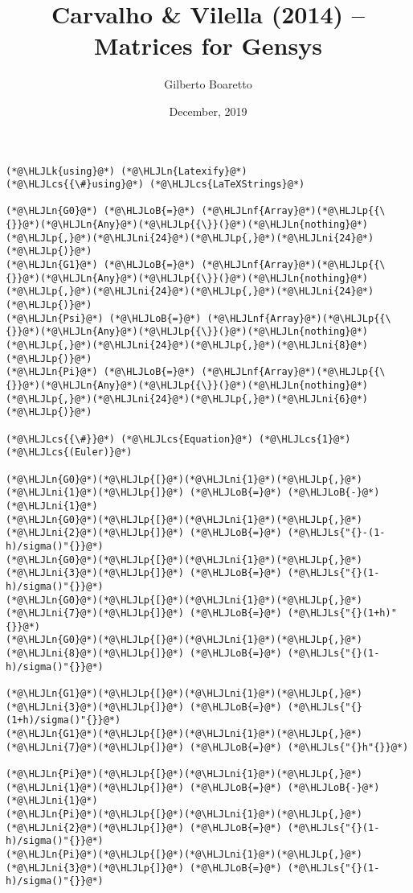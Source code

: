 \documentclass[12pt,a4paper]{article}
\title{ Carvalho & Vilella (2014) -- Matrices for Gensys }
\author{ Gilberto Boaretto }
\date{ December, 2019 }
\newcommand{\HLJLk}[1]{\textcolor[RGB]{148,91,176}{\textbf{#1}}}
\newcommand{\HLJLn}[1]{#1}
\newcommand{\HLJLnf}[1]{\textcolor[RGB]{66,102,213}{#1}}
\newcommand{\HLJLs}[1]{\textcolor[RGB]{201,61,57}{#1}}
\newcommand{\HLJLni}[1]{\textcolor[RGB]{59,151,46}{#1}}
\newcommand{\HLJLoB}[1]{\textcolor[RGB]{102,102,102}{\textbf{#1}}}
\newcommand{\HLJLp}[1]{#1}
\newcommand{\HLJLcs}[1]{\textcolor[RGB]{153,153,119}{\textit{#1}}}
\begin{document}
\maketitle


\begin{lstlisting}
(*@\HLJLk{using}@*) (*@\HLJLn{Latexify}@*)
(*@\HLJLcs{{\#}using}@*) (*@\HLJLcs{LaTeXStrings}@*)

(*@\HLJLn{G0}@*) (*@\HLJLoB{=}@*) (*@\HLJLnf{Array}@*)(*@\HLJLp{{\{}}@*)(*@\HLJLn{Any}@*)(*@\HLJLp{{\}}(}@*)(*@\HLJLn{nothing}@*)(*@\HLJLp{,}@*)(*@\HLJLni{24}@*)(*@\HLJLp{,}@*)(*@\HLJLni{24}@*)(*@\HLJLp{)}@*)
(*@\HLJLn{G1}@*) (*@\HLJLoB{=}@*) (*@\HLJLnf{Array}@*)(*@\HLJLp{{\{}}@*)(*@\HLJLn{Any}@*)(*@\HLJLp{{\}}(}@*)(*@\HLJLn{nothing}@*)(*@\HLJLp{,}@*)(*@\HLJLni{24}@*)(*@\HLJLp{,}@*)(*@\HLJLni{24}@*)(*@\HLJLp{)}@*)
(*@\HLJLn{Psi}@*) (*@\HLJLoB{=}@*) (*@\HLJLnf{Array}@*)(*@\HLJLp{{\{}}@*)(*@\HLJLn{Any}@*)(*@\HLJLp{{\}}(}@*)(*@\HLJLn{nothing}@*)(*@\HLJLp{,}@*)(*@\HLJLni{24}@*)(*@\HLJLp{,}@*)(*@\HLJLni{8}@*)(*@\HLJLp{)}@*)
(*@\HLJLn{Pi}@*) (*@\HLJLoB{=}@*) (*@\HLJLnf{Array}@*)(*@\HLJLp{{\{}}@*)(*@\HLJLn{Any}@*)(*@\HLJLp{{\}}(}@*)(*@\HLJLn{nothing}@*)(*@\HLJLp{,}@*)(*@\HLJLni{24}@*)(*@\HLJLp{,}@*)(*@\HLJLni{6}@*)(*@\HLJLp{)}@*)

(*@\HLJLcs{{\#}}@*) (*@\HLJLcs{Equation}@*) (*@\HLJLcs{1}@*) (*@\HLJLcs{(Euler)}@*)

(*@\HLJLn{G0}@*)(*@\HLJLp{[}@*)(*@\HLJLni{1}@*)(*@\HLJLp{,}@*)(*@\HLJLni{1}@*)(*@\HLJLp{]}@*) (*@\HLJLoB{=}@*) (*@\HLJLoB{-}@*)(*@\HLJLni{1}@*)
(*@\HLJLn{G0}@*)(*@\HLJLp{[}@*)(*@\HLJLni{1}@*)(*@\HLJLp{,}@*)(*@\HLJLni{2}@*)(*@\HLJLp{]}@*) (*@\HLJLoB{=}@*) (*@\HLJLs{"{}-(1-h)/sigma()"{}}@*)
(*@\HLJLn{G0}@*)(*@\HLJLp{[}@*)(*@\HLJLni{1}@*)(*@\HLJLp{,}@*)(*@\HLJLni{3}@*)(*@\HLJLp{]}@*) (*@\HLJLoB{=}@*) (*@\HLJLs{"{}(1-h)/sigma()"{}}@*)
(*@\HLJLn{G0}@*)(*@\HLJLp{[}@*)(*@\HLJLni{1}@*)(*@\HLJLp{,}@*)(*@\HLJLni{7}@*)(*@\HLJLp{]}@*) (*@\HLJLoB{=}@*) (*@\HLJLs{"{}(1+h)"{}}@*)
(*@\HLJLn{G0}@*)(*@\HLJLp{[}@*)(*@\HLJLni{1}@*)(*@\HLJLp{,}@*)(*@\HLJLni{8}@*)(*@\HLJLp{]}@*) (*@\HLJLoB{=}@*) (*@\HLJLs{"{}(1-h)/sigma()"{}}@*)

(*@\HLJLn{G1}@*)(*@\HLJLp{[}@*)(*@\HLJLni{1}@*)(*@\HLJLp{,}@*)(*@\HLJLni{3}@*)(*@\HLJLp{]}@*) (*@\HLJLoB{=}@*) (*@\HLJLs{"{}(1+h)/sigma()"{}}@*)
(*@\HLJLn{G1}@*)(*@\HLJLp{[}@*)(*@\HLJLni{1}@*)(*@\HLJLp{,}@*)(*@\HLJLni{7}@*)(*@\HLJLp{]}@*) (*@\HLJLoB{=}@*) (*@\HLJLs{"{}h"{}}@*)

(*@\HLJLn{Pi}@*)(*@\HLJLp{[}@*)(*@\HLJLni{1}@*)(*@\HLJLp{,}@*)(*@\HLJLni{1}@*)(*@\HLJLp{]}@*) (*@\HLJLoB{=}@*) (*@\HLJLoB{-}@*)(*@\HLJLni{1}@*)
(*@\HLJLn{Pi}@*)(*@\HLJLp{[}@*)(*@\HLJLni{1}@*)(*@\HLJLp{,}@*)(*@\HLJLni{2}@*)(*@\HLJLp{]}@*) (*@\HLJLoB{=}@*) (*@\HLJLs{"{}(1-h)/sigma()"{}}@*)
(*@\HLJLn{Pi}@*)(*@\HLJLp{[}@*)(*@\HLJLni{1}@*)(*@\HLJLp{,}@*)(*@\HLJLni{3}@*)(*@\HLJLp{]}@*) (*@\HLJLoB{=}@*) (*@\HLJLs{"{}(1-h)/sigma()"{}}@*)


\end{lstlisting}
\end{document}
